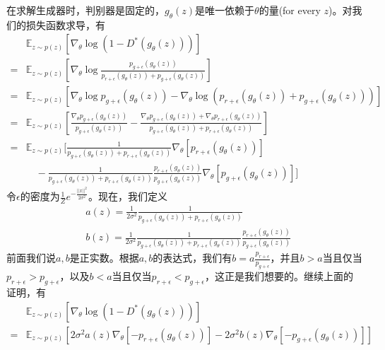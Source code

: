             \begin{Proof}
            在求解生成器时，判别器是固定的，$g_\theta(z)$是唯一依赖于$\theta$的量(for every $z$)。对我们的损失函数求导，有
            \begin{align*}
            &\mathbb{E}_{z\sim p(z)}[\nabla_\theta\log(1-D^*(g_\theta(z)))]\\
            ={}&\mathbb{E}_{z\sim p(z)}\left[ \nabla_\theta\log \frac{p_{g+\epsilon}(g_\theta(z))}{p_{r+\epsilon}(g_\theta(z))+ p_{g+\epsilon}(g_\theta(z))}   \right]\\
            ={}&\mathbb{E}_{z\sim p(z)}\left[ \nabla_\theta\log p_{g+\epsilon}(g_\theta(z))- \nabla_\theta\log (p_{r+\epsilon}(g_\theta(z))+p_{g+\epsilon}(g_\theta(z)))  \right]\\
            ={}&\mathbb{E}_{z\sim p(z)}\left[ \frac{\nabla_\theta p_{g+\epsilon}(g_\theta(z))}{p_{g+\epsilon}(g_\theta(z))} - \frac{\nabla_\theta p_{g+\epsilon}(g_\theta(z))+\nabla_\theta p_{r+\epsilon}(g_\theta(z))}{p_{g+\epsilon}(g_\theta(z))+ p_{r+\epsilon}(g_\theta(z))}    \right]\\
            ={}&\mathbb{E}_{z\sim p(z)}\bigg[ \frac{1}{p_{g+\epsilon}(g_\theta(z))+ p_{r+\epsilon}(g_\theta(z))} \nabla_\theta[p_{r+\epsilon}(g_\theta(z))] \\
            & \quad -  \frac{1}{p_{g+\epsilon}(g_\theta(z))+ p_{r+\epsilon}(g_\theta(z))} \frac{p_{r+\epsilon}(g_\theta(z))}{p_{g+\epsilon}(g_\theta(z))}\nabla_\theta[p_{g+\epsilon}(g_\theta(z))]
             \bigg]
            \end{align*}
            令$\epsilon$的密度为$\frac{1}{Z}e^{-\frac{||x||^2}{2\sigma^2}}$。现在，我们定义
            \begin{align*}
            & a(z) = \frac{1}{2\sigma^2} \frac{1}{p_{g+\epsilon}(g_\theta(z))+ p_{r+\epsilon}(g_\theta(z))}\\
            & b(z) = \frac{1}{2\sigma^2} \frac{1}{p_{g+\epsilon}(g_\theta(z))+ p_{r+\epsilon}(g_\theta(z))}\frac{p_{r+\epsilon}(g_\theta(z))}{p_{g+\epsilon}(g_\theta(z))}
            \end{align*}
            前面我们说$a,b$是正实数。根据$a,b$的表达式，我们有$b=a\frac{p_{r+\epsilon}}{p_{g+\epsilon}}$，并且$b>a$当且仅当$p_{r+\epsilon}>p_{g+\epsilon}$，以及$b<a$当且仅当$p_{r+\epsilon}<p_{g+\epsilon}$，这正是我们想要的。继续上面的证明，有
            \begin{align*}
            &\mathbb{E}_{z\sim p(z)}[\nabla_\theta\log(1-D^*(g_\theta(z)))]\\
            ={}&\mathbb{E}_{z\sim p(z)}[2\sigma^2a(z)\nabla_\theta[-p_{r+\epsilon}(g_\theta(z))] - 2\sigma^2b(z)\nabla_\theta[-p_{g+\epsilon}(g_\theta(z))]]\\

\end{align*}
\end{Proof}
